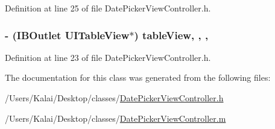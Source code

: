 Definition at line 25 of file Date\-Picker\-View\-Controller.\-h.

\hypertarget{interface_date_picker_view_controller_a982400761463df927eb7af866537ece0}{
\subsubsection[{table\-View}]{\setlength{\rightskip}{0pt plus 5cm}-\/ (I\-B\-Outlet U\-I\-Table\-View$\ast$) table\-View\hspace{0.3cm}{\ttfamily [read]}, {\ttfamily [write]}, {\ttfamily [nonatomic]}, {\ttfamily [strong]}}}\label{interface_date_picker_view_controller_a982400761463df927eb7af866537ece0}


Definition at line 23 of file Date\-Picker\-View\-Controller.\-h.



The documentation for this class was generated from the following files\-:\begin{DoxyCompactItemize}
\item 
/\-Users/\-Kalai/\-Desktop/classes/\hyperlink{_date_picker_view_controller_8h}{Date\-Picker\-View\-Controller.\-h}\item 
/\-Users/\-Kalai/\-Desktop/classes/\hyperlink{_date_picker_view_controller_8m}{Date\-Picker\-View\-Controller.\-m}\end{DoxyCompactItemize}

